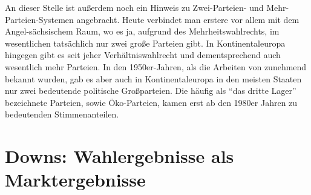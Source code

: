 An dieser Stelle ist außerdem noch ein Hinweis zu Zwei-Parteien- und Mehr-Parteien-Systemen angebracht. Heute verbindet man erstere vor allem mit dem Angel-sächsischem Raum, wo es ja, aufgrund des Mehrheitswahlrechts, im wesentlichen tatsächlich nur zwei große Parteien gibt. In Kontinentaleuropa hingegen gibt es seit jeher Verhältniswahlrecht und dementsprechend auch wesentlich mehr Parteien. In den 1950er-Jahren, als die Arbeiten von \textcite{Black1948a, Black1958} zunehmend bekannt wurden, gab es aber auch in Kontinentaleuropa in den meisten Staaten nur zwei bedeutende politische Großparteien. Die häufig als "`das dritte Lager"' bezeichnete Parteien, sowie Öko-Parteien, kamen erst ab den 1980er Jahren zu bedeutenden Stimmenanteilen.


\section{Downs: Wahlergebnisse als Marktergebnisse}

